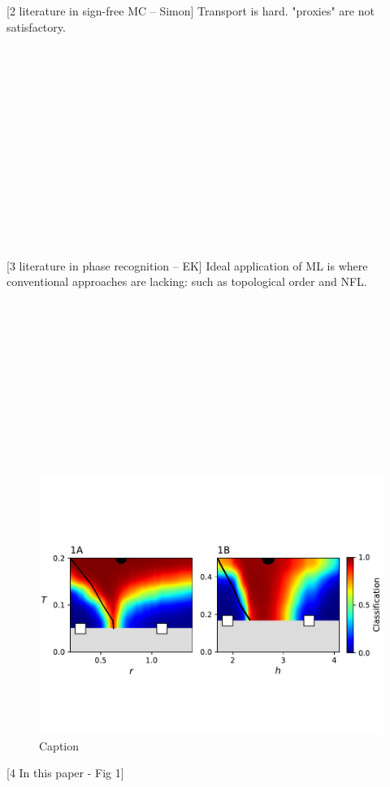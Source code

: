 \documentclass[amsmath,amssymb, aps, prx, longbibliography, twocolumn]{revtex4-1}
\begin{document}
[2 literature in sign-free MC -- Simon]
Transport is hard. "proxies" are not satisfactory.
\\
\\
\\
\\
\\
\\
\\
\\
\\
\\
\\
\\
\\
\\
\\

[3 literature in phase recognition -- EK]
Ideal application of ML is where conventional approaches are lacking: such as topological order and NFL.
 \\
 \\
 \\
 \\
 \\
 \\
 \\
 \\
 \\
 \\
 \\
 \\
 \begin{figure} [t]
    \centering
\includegraphics[width=.5\textwidth, trim={0 2.75cm 0 3cm}, clip]{3pt_pds.pdf}
    \caption{Caption}
    \label{fig:pds}
\end{figure}
[4 In this paper - Fig 1] 
\\
\\
\\
\\
\\
\\
\\
\\
\end{document}
